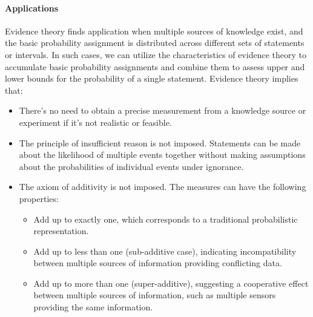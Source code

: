 \paragraph*{Applications}
Evidence theory finds application when multiple sources of knowledge exist, and the basic probability assignment is distributed across different sets of statements or intervals. 
In such cases, we can utilize the characteristics of evidence theory to accumulate basic probability assignments and combine them to assess upper and lower bounds for the probability of a single statement. 
Evidence theory implies that: 
\begin{itemize}
    \item There's no need to obtain a precise measurement from a knowledge source or experiment if it's not realistic or feasible.
    \item The principle of insufficient reason is not imposed. 
        Statements can be made about the likelihood of multiple events together without making assumptions about the probabilities of individual events under ignorance.
    \item The axiom of additivity is not imposed. 
        The measures can have the following properties:
        \begin{itemize}
            \item Add up to exactly one, which corresponds to a traditional probabilistic representation.
            \item Add up to less than one (sub-additive case), indicating incompatibility between multiple sources of information providing conflicting data.
            \item Add up to more than one (super-additive), suggesting a cooperative effect between multiple sources of information, such as multiple sensors providing the same information.
        \end{itemize}
\end{itemize}


